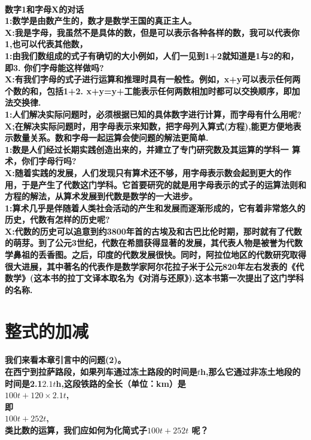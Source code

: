 \documentclass[UTF8]{report}
\theoremstyle{definition}
\theoremstyle{remark}
\begin{document}
\paragraph{数字1和字母X的对话\\1:数学是由数产生的，数才是数学王国的真正主人。\\X:我是字母，我虽然不是具体的数，但是可以表示各种各样的数，我可以代表你1,也可以代表其他数，\\1:由我们数组成的式子有确切的大小例如，人们一见到1+2就知道是1与2的和，即3. 你们字母能这样做吗?\\X:有我们字母的式子进行运算和推理时具有一般性。例如，x+y可以表示任何两个数的和，包括1+2. x+y=y+工能表示任何两数相加时都可以交换顺序，即加法交换律.\\1:人们解决实际问题时，必须根据已知的具体数字进行计算，而字母有什么用呢?X;在解决实际问题时，用字母表示来知数，把字母列入算式(方程),能更方便地表示数量关系。数和字母一起运算会使问题的解法更简单.\\1:数是人们经过长期实践创造出来的，并建立了专门研究数及其运算的学科一 算术，你们字母行吗?\\X:随着实践的发展，人们发现只有算术还不够，用字母表示数会起到更大的作用，于是产生了代数这门学科。它首要研究的就是用字母表示的式子的运算法则和方程的解法，从算术发展到代数是数学的一大进步。\\1:算术几乎是伴随着人类社会活动的产生和发展而逐渐形成的，它有着非常悠久的历史，代数有怎样的历史呢?\\X:代数的历史可以追意到约3800年首的古埃及和古巴比伦时期，那时就有了代数的萌芽。到了公元3世纪，代数在希腊获得显著的发展，其代表人物是被誉为代数学鼻祖的丢香图。之后，印度的代数发展很快。同时，阿拉位地区的代数研究取得很大进展，其中著名的代表作是数学家阿尔花拉子米于公元820年左右发表的《代数学》(这本书的拉丁文译本取名为《对消与还原》).这本书第一次提出了这门学科的名称.}
\section*{整式的加减}
\paragraph{我们来看本章引言中的问题(2)。\\在西宁到拉萨路段，如果列车通过冻土路段的时间是$t$h,那么它通过非冻土地段的时间是2.1$2.1t$h,这段铁路的全长（单位：km）是\\$100t+120\times2.1t$,\\ 即\\$100t+252t$,\\ 类比数的运算，我们应如何为化简式子$100t+252t$ 呢？}
\end{document}
